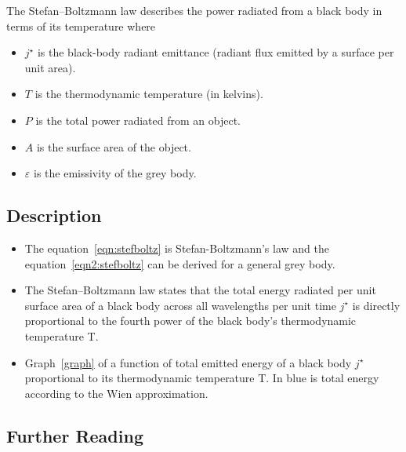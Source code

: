 The Stefan–Boltzmann law describes the power radiated from a black body in terms of its temperature where

\begin{itemize}
        \item $j^{\star}$ is the black-body radiant emittance (radiant flux emitted by a surface per unit area).

        \item $T$ is the thermodynamic temperature (in kelvins).
        \item $P$ is the total power radiated from an object.
        \item $A$ is the surface area of the object.
        \item $\varepsilon$ is the emissivity of the grey body.

\end{itemize}

\subsection{Description}

\begin{itemize}

    \item The equation~\ref{eqn:stefboltz} is Stefan-Boltzmann's law and the equation~\ref{eqn2:stefboltz} can be derived for a general grey body.

    \item The Stefan–Boltzmann law states that the total energy radiated per unit surface area of a black body across all wavelengths per unit time $j^{\star}$ is directly proportional to the fourth power of the black body's thermodynamic temperature T.

    \item Graph~\ref{graph} of a function of total emitted energy of a black body $j^{\star}$ proportional to its thermodynamic temperature T. In blue is total energy according to the Wien approximation.

\end{itemize}

\subsection{Further Reading}

